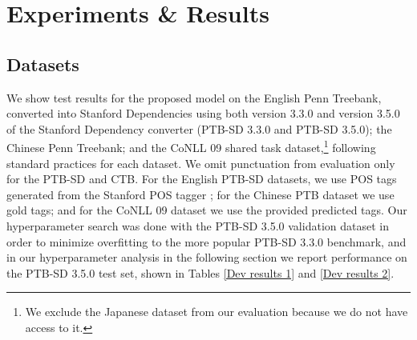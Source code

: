 \documentclass[11pt,a4paper]{article}
\begin{document}
\section{Experiments \&{} Results}
\subsection{Datasets}
We show test results for the proposed model on the English Penn Treebank, converted into Stanford Dependencies using both version 3.3.0 and version 3.5.0 of the Stanford Dependency converter (PTB-SD 3.3.0 and PTB-SD 3.5.0); the Chinese Penn Treebank; and the CoNLL 09 shared task dataset,\footnote{We exclude the Japanese dataset from our evaluation because we do not have access to it.} following standard practices for each dataset. We omit punctuation from evaluation only for the PTB-SD and CTB. For the English PTB-SD datasets, we use POS tags generated from the Stanford POS tagger \citep{Toutanovaetal2003}; for the Chinese PTB dataset we use gold tags; and for the CoNLL 09 dataset we use the provided predicted tags. Our hyperparameter search was done with the PTB-SD 3.5.0 validation dataset in order to minimize overfitting to the more popular PTB-SD 3.3.0 benchmark, and in our hyperparameter analysis in the following section we report performance on the PTB-SD 3.5.0 test set, shown in Tables \ref{Dev results 1} and \ref{Dev results 2}.
\end{document}
